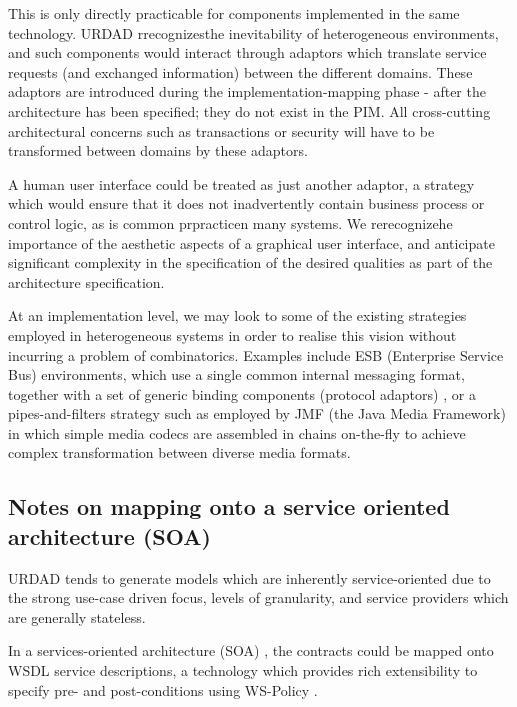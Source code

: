 This is only directly practicable for components implemented in the same
technology. URDAD rrecognizesthe inevitability of heterogeneous environments,
and such components would interact through adaptors which translate service requests 
(and exchanged information) between the different domains. These adaptors are
introduced during the implementation-mapping phase - after the architecture has been
specified; they do not exist in the PIM.
All cross-cutting architectural concerns such as transactions or security will
have to be transformed between domains by these adaptors.

A human user interface could be treated as just another adaptor, a strategy
which would ensure that it does not inadvertently contain business process or
control logic, as is common prpracticen many systems. We rerecognizehe importance
of the aesthetic aspects of a graphical user interface, and anticipate significant 
complexity in the specification of the desired qualities as part of the 
architecture specification.

At an implementation level, we may look to some of the existing strategies employed in
heterogeneous systems in order to realise this vision without incurring
a problem of combinatorics. Examples include ESB (Enterprise Service Bus)
environments, which use a single common internal messaging format, together with a set of generic
binding components (protocol adaptors) \cite{tenHove:jbiComponentsTheory}, 
or a pipes-and-filters strategy such as employed by 
JMF (the Java Media Framework) \cite{sun:jmfCodecs} in which simple media codecs 
are assembled in chains on-the-fly to achieve complex transformation between 
diverse media formats.


\subsection{Notes on mapping onto a service oriented architecture (SOA)}

URDAD tends to generate models which are inherently service-oriented
due to the strong use-case driven focus, levels of granularity, and
service providers which are generally stateless.

In a services-oriented architecture (SOA) \cite{erl:soa}, the contracts 
could be mapped onto WSDL service descriptions, a technology
which provides rich extensibility to specify pre- and post-conditions
using WS-Policy \cite{w3c:wsPolicy}.

